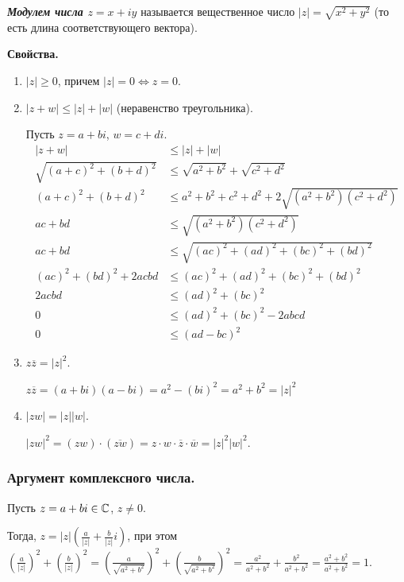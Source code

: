 \begin{definition}
    \textbf{\textit{Модулем числа $z = x + iy$}} называется вещественное число $|z| = \sqrt{x^2 + y^2}$ (то есть длина соответствующего вектора).
\end{definition}

\textbf{Свойства.}

\begin{enumerate}[label={\arabic*°.}]
    \item $|z| \geq 0$, причем $|z| = 0 \iff z = 0$.
    \item $|z + w| \leq |z| + |w|$ (неравенство треугольника).

    Пусть $z = a + bi$, $w = c + di$.
    \begin{align*}
        |z + w| &\leq |z| + |w| \\
        \sqrt{(a + c)^2 + (b + d)^2} &\leq \sqrt{a^2 + b^2} + \sqrt{c^2 + d^2} \\
        (a + c)^2 + (b + d)^2 &\leq a^2 + b^2 + c^2 + d^2 + 2\sqrt{(a^2 + b^2)(c^2 + d^2)} \\
        ac + bd &\leq\sqrt{(a^2 + b^2)(c^2 + d^2)} \\
        ac + bd &\leq\sqrt{(ac)^2 + (ad)^2 + (bc)^2 + (bd)^2} \\
        (ac)^2 + (bd)^2 + 2acbd &\leq (ac)^2 + (ad)^2 + (bc)^2 + (bd)^2 \\
        2acbd &\leq (ad)^2 + (bc)^2 \\
        0 &\leq (ad)^2 + (bc)^2 - 2abcd \\
        0 &\leq (ad - bc)^2
    \end{align*}
    \item $z \overline{z} = |z|^2$.

    $z \overline{z} = (a + bi)(a - bi) = a^2 - (bi)^2 = a^2 + b^2 = |z|^2$
    \item $|zw| = |z||w|$.

    $|zw|^2 = (zw) \cdot (\overline{zw}) = z \cdot w \cdot \overline{z} \cdot \overline{w} = |z|^2 |w|^2$.
\end{enumerate}


\subsubsection*{
    Аргумент комплексного числа.
}


Пусть $z = a + bi \in \mathbb{C}$, $z \neq 0$.

Тогда, $z = |z| \left(\frac{a}{|z|} + \frac{b}{|z|}i\right)$, при этом $\left(\frac{a}{|z|}\right)^2 + \left(\frac{b}{|z|}\right)^2 = (\frac{a}{\sqrt{a^2 + b^2}})^2 + (\frac{b}{\sqrt{a^2 + b^2}})^2 = \frac{a^2}{a^2 + b^2} + \frac{b^2}{a^2 + b^2} = \frac{a^2 + b^2}{a^2 + b^2} = 1.$

